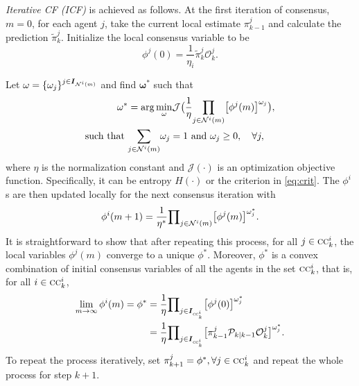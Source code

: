 \documentclass[journal]{IEEEtran}
\newcommand{\vect}[1]{{\mathbf{#1}}}
\theoremstyle{remark}
\newcommand{\bIs}[1]{\boldsymbol{I}_{#1}}  %
\newcommand{\suf}[1]{\textsc{\tiny #1}}  %
\theoremstyle{definition}
\begin{document}
    \emph{Iterative CF (ICF)} is achieved as follows. At the first 
    iteration of consensus, $m=0$, for each agent $j$, take the current local 
    estimate ${\pi}_{k-1}^j$ and calculate the prediction $\tilde{\pi}_k^j$. 
    Initialize the local 
    consensus variable to be  $$\mathcal{\phi}^j(0) 
    =\frac{1}{\eta_i}\tilde{\pi}_k^j\mathcal{O}_k^j. $$ 

Let $\vect{\omega}= \{\omega_{j}\}^{j\in\bIs{{\cal N}^{i}(m)}}$ and find 
$\vect{\omega}^*$ such 
that 
\begin{equation}
\label{eq:opt_problem}
\begin{aligned}
\vect{\omega}^* &= { \arg \min_{\omega}}  \mathcal{J} \big( \frac{1}{\eta} {\prod_{j \in {\cal N}^{i}(m)} }  \big[\mathcal{\phi}^j(m)\big]^{\omega_{j}} \big), \\
\text{such that }&  {\sum_{j \in {\cal N}^{i}(m)}} \omega_{j}= 1 \text{ and }\omega_j\geq 0, \quad \forall j,
\end{aligned}
\end{equation}
where $\eta$ is the normalization constant and $\mathcal{J}(\cdot)$ is an 
optimization objective function. Specifically, it can be entropy $H(\cdot)$ or 
the criterion in \eqref{eq:crit}. The $\mathcal{\phi}^i$s are then updated locally 
for the next consensus iteration with
\begin{equation}
\mathcal{\phi}^i(m + 1) =  \frac{1}{\eta^*} {\prod\nolimits_{j \in {\cal N}^{i}(m)} }  \big[\mathcal{\phi}^j(m)\big]^{\omega_{j}^*}.
\end{equation}
It is straightforward to show that after repeating this process, 
for all $j \in \textsc{cc}^i_k$, the local variables $\mathcal{\phi}^j(m)$ converge 
to a unique $\mathcal{\phi}^*$. Moreover, $\mathcal{\phi}^*$ is
a convex combination of initial consensus 
variables of all the agents in the set $\textsc{cc}^i_k$, that is,
for all $ i \in \textsc{cc}^i_k$,
\begin{align}
\lim\limits_{m\rightarrow 
\infty}\vect{\phi}^{i}(m) = \mathcal{\phi}^*&= 
\frac{1}{\eta} 
{\prod\nolimits_{j \in \bIs{\suf{cc}^i_k} } }  
\big[\mathcal{\phi}^j(0)\big]^{\omega_{j}^*}\\
&= \frac{1}{\eta}{\prod\nolimits_{j \in \bIs{\suf{cc}^i_k} } }\big[{\pi}_{k-1}^j\mathcal{P}_{k\vert k-1}\mathcal{O}_k^j\big]^{\omega_{j}^*}.
\end{align}
To repeat the process iteratively, set ${\pi}_{k+1}^j = \mathcal{\phi}^*, \forall j \in \textsc{cc}^i_k$ and 
repeat the whole process for step $k+1$.
\end{document}
